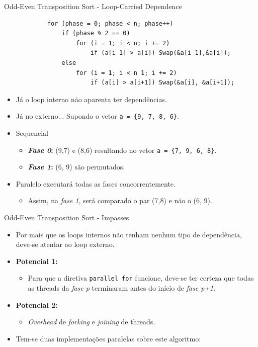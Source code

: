 	\begin{frame}[fragile]{Odd-Even Transposition Sort - Loop-Carried Dependence}
		\begin{verbatim}
			for (phase = 0; phase < n; phase++) 
				if (phase % 2 == 0)
					for (i = 1; i < n; i += 2)
						if (a[i 1] > a[i]) Swap(&a[i 1],&a[i]); 
				else
					for (i = 1; i < n 1; i += 2)
						if (a[i] > a[i+1]) Swap(&a[i], &a[i+1]);
		\end{verbatim}
		\begin{itemize}
			\setlength\itemsep{0.4em}
			\item Já o loop interno não aparenta ter dependências.
					\bigskip
			\item Já no externo... \pause Supondo o vetor {\tt a = \{9, 7, 8, 6\}}. 
			\item Sequencial
			\begin{itemize}
				\setlength\itemsep{0.2em}
				\item \textbf{\textit{Fase 0}:} (9,7) e (8,6) resultando no vetor {\tt a = \{7, 9, 6, 8\}}.
				\item \textbf{\textit{Fase 1}:} (6, 9) são permutados.
			\end{itemize}
					\pause
			\item Paralelo executará todas as fases concorrentemente.
			\begin{itemize}
				\item Assim, na \textit{fase 1}, será comparado o par (7,8) e não o (6, 9).
			\end{itemize}
		\end{itemize}
\end{frame}


			
	\begin{frame}{Odd-Even Transposition Sort - Impasses}
		\begin{itemize}
			\setlength\itemsep{1em}
			\item Por mais que os loops internos não tenham nenhum tipo de dependência, deve-se atentar ao loop externo.
			\item \textbf{Potencial 1:}
			\begin{itemize}
				\item Para que a diretiva {\tt parallel for} funcione, deve-se ter certeza que todas as threads da \textit{fase p} terminaram antes do início de \textit{fase p+1}.
			\end{itemize}
			\item \textbf{Potencial 2:}
			\begin{itemize}
				\item \textit{Overhead} de \textit{forking} e \textit{joining} de threads.
			\end{itemize}

					\bigskip
			\item Tem-se duas implementações paralelas sobre este algoritmo:
		\end{itemize}
	\end{frame}



